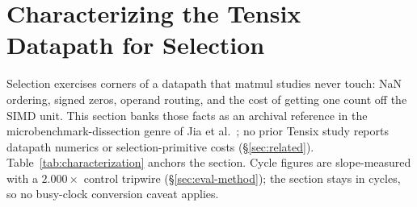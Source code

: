 \section{Characterizing the Tensix Datapath for Selection}
\label{sec:characterization}

Selection exercises corners of a datapath that matmul studies never
touch: NaN ordering, signed zeros, operand routing, and the cost of
getting one count off the SIMD unit. This section banks those facts as an
archival reference in the
microbenchmark-dissection genre of Jia et al.~\cite{jia2019ipu}; no prior
Tensix study reports datapath numerics or selection-primitive costs
(\S\ref{sec:related}).
Table~\ref{tab:characterization} anchors the section. Cycle figures
are slope-measured with a $2.000\times$ control
tripwire (\S\ref{sec:eval-method}); the section stays in cycles, so no
busy-clock conversion caveat applies.

